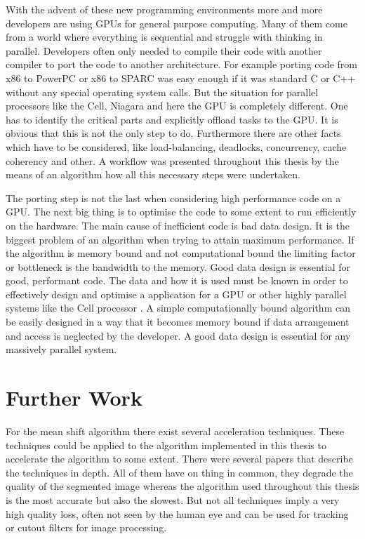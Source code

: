 With the advent of these new programming environments more and more developers
are using \glspl{GPU} for general purpose computing. Many of them come from a
world where everything is sequential and struggle with thinking in parallel.
Developers often only needed to compile their code with another compiler to
port the code to another architecture. For example porting code from x86
to PowerPC or x86 to \gls{SPARC}  was easy enough if it was standard C or C++
without any special operating system calls. But the situation for parallel
processors like the Cell, Niagara and here the \gls{GPU} is completely
different. One has to identify the critical parts and explicitly offload tasks
to the \gls{GPU}. It is obvious that this is not the only step to do.
Furthermore there are other facts which have to be considered, like
load-balancing, deadlocks, concurrency, cache coherency and other. A workflow
was presented throughout this thesis by the means of an algorithm how all this
necessary steps were undertaken.

The porting step is not the last when considering high performance code on a
\gls{GPU}. The next big thing is to optimise the code to some extent to run
efficiently on the hardware. The main cause of inefficient code is bad data
design. It is the biggest problem of an algorithm when trying to attain maximum
performance. If the algorithm is memory bound and not computational bound the
limiting factor or bottleneck is the bandwidth to the memory. Good data design
is essential for good, performant code. The data and how it is used must be
known in order to effectively design and optimise a application for a \gls{GPU}
or other highly parallel systems like the Cell processor
\citep{citeulike:80546}. A simple computationally bound algorithm can be easily
designed in a way that it becomes memory bound if data arrangement and access is
neglected by the developer. A good data design is essential for any massively
parallel system.


\section{Further Work} %
\label{sec:further_work}
For the mean shift algorithm there exist several acceleration techniques. These
techniques could be applied to the algorithm implemented in this thesis to
accelerate the algorithm to some extent. There were several papers that describe
the techniques in depth. All of them have on thing in common, they degrade the
quality of the segmented image whereas the algorithm used throughout this thesis
is the most accurate but also the slowest. But not all techniques imply a very high
quality loss, often not seen by the human eye and can be used for tracking or
cutout filters for image processing. 


